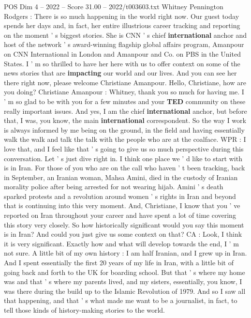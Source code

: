 \begin{textsample}{POS Dim 4 – 2022 – Score 31.00 – 2022/t003603.txt}  \label{ex:f4_pos_029}
Whitney Pennington Rodgers : There is so much happening in the world right now.
Our guest today spends her days and, in fact, her entire illustrious career tracking and reporting on the moment ' s biggest stories.
She is CNN ' s chief \textbf{international} anchor and host of the network ' s award-winning flagship global affairs program, Amanpour on CNN International in London and Amanpour and Co. on PBS in the United States.
I ' m so thrilled to have her here with us to offer context on some of the news stories that are \textbf{impacting} our world and our lives.
And you can see her there right now, please welcome Christiane Amanpour.
Hello, Christiane, how are you doing?
Christiane Amanpour : Whitney, thank you so much for having me.
I ' m so glad to be with you for a few minutes and your \textbf{TED} community on these really important issues.
And yes, I am the chief \textbf{international} anchor, but before that, I was, you know, the main \textbf{international} correspondent.
So the way I work is always informed by me being on the ground, in the field and having essentially walk the walk and talk the talk with the people who are at the coalface.
WPR : I love that, and I feel like that ' s going to give us so much perspective during this conversation.
Let ' s just dive right in.
I think one place we ' d like to start with is in Iran.
For those of you who are on the call who haven ' t been tracking, back in September, an Iranian woman, Mahsa Amini, died in the custody of Iranian morality police after being arrested for not wearing hijab.
Amini ' s death sparked protests and a revolution around women ' s rights in Iran and beyond that is continuing into this very moment.
And, Christiane, I know that you ' ve reported on Iran throughout your career and have spent a lot of time covering this story very closely.
So how historically significant would you say this moment is in Iran?
And could you just give us some context on that?
CA : Look, I think it is very significant.
Exactly how and what will develop towards the end, I ' m not sure.
A little bit of my own history : I am half Iranian, and I grew up in Iran.
And I spent essentially the first 20 years of my life in Iran, with a little bit of going back and forth to the UK for boarding school.
But that ' s where my home was and that ' s where my parents lived, and my sisters, essentially, you know, I was there during the build up to the Islamic Revolution of 1979.
And so I saw all that happening, and that ' s what made me want to be a journalist, in fact, to tell those kinds of history-making stories to the world.

\end{textsample}
